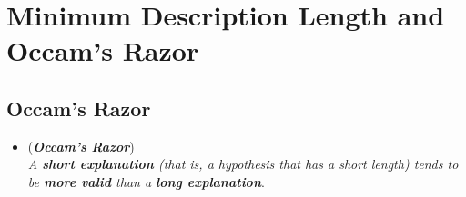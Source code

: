 \documentclass[11pt]{article}
\begin{document}
\section{Minimum Description Length and Occam's Razor}
\subsection{Occam's Razor}
\begin{itemize}
\item \begin{remark} (\emph{\textbf{Occam's Razor}})\\
\emph{A \textbf{short explanation} (that is, a hypothesis that has a short length) tends to be \textbf{more valid} than a \textbf{long explanation}}.
\end{remark}
\end{itemize}
\end{document}
